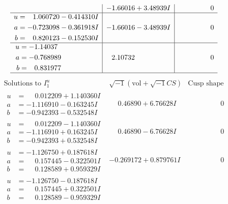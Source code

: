 \documentclass[1p]{elsarticle_modified}
\theoremstyle{definition}
\newcommand{\I}{\sqrt{-1}}
\begin{document}
$$\begin{array}{c|c|c}
 & -1.66016 + 3.48939 I & \phantom{-0.000000 } 0 \\ \hline\begin{aligned}
u &= \phantom{-}1.060720 - 0.414310 I \\
a &= -0.723098 - 0.361918 I \\
b &= \phantom{-}0.820123 - 0.152530 I\end{aligned}
 & -1.66016 - 3.48939 I & \phantom{-0.000000 } 0 \\ \hline\begin{aligned}
u &= -1.14037\phantom{ +0.000000I} \\
a &= -0.768989\phantom{ +0.000000I} \\
b &= \phantom{-}0.831977\phantom{ +0.000000I}\end{aligned}
 & \phantom{-}2.10732\phantom{ +0.000000I} & \phantom{-0.000000 } 0\\
 \hline 
 \end{array}$$\newpage$$\begin{array}{c|c|c}  
\text{Solutions to }I^u_{1}& \I (\text{vol} + \sqrt{-1}CS) & \text{Cusp shape}\\
 \hline 
\begin{aligned}
u &= \phantom{-}0.012209 + 1.140360 I \\
a &= -1.116910 - 0.163245 I \\
b &= -0.942393 - 0.532548 I\end{aligned}
 & \phantom{-}0.46890 + 6.76628 I & \phantom{-0.000000 } 0 \\ \hline\begin{aligned}
u &= \phantom{-}0.012209 - 1.140360 I \\
a &= -1.116910 + 0.163245 I \\
b &= -0.942393 + 0.532548 I\end{aligned}
 & \phantom{-}0.46890 - 6.76628 I & \phantom{-0.000000 } 0 \\ \hline\begin{aligned}
u &= -1.126750 + 0.187618 I \\
a &= \phantom{-}0.157445 - 0.322501 I \\
b &= \phantom{-}0.128589 + 0.959329 I\end{aligned}
 & -0.269172 + 0.879761 I & \phantom{-0.000000 } 0 \\ \hline\begin{aligned}
u &= -1.126750 - 0.187618 I \\
a &= \phantom{-}0.157445 + 0.322501 I \\
b &= \phantom{-}0.128589 - 0.959329 I\end{aligned}

\end{array}$$
\end{document}
